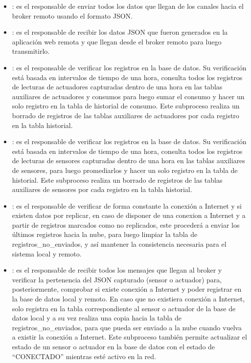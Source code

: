 \begin{itemize}
\item {}: es el responsable de enviar todos los datos que llegan de los canales hacia el broker remoto usando el formato JSON.

\item {}: es el responsable de recibir los datos JSON que fueron generados en la aplicación web remota y que llegan desde el broker remoto para luego transmitirlo.

\item {}: es el responsable de verificar los registros en la base de datos. Su verificación está basada en intervalos de tiempo de una hora, consulta todos los registros de lecturas de actuadores capturadas dentro de una hora en las tablas auxiliares de actuadores y consumos para luego sumar el consumo y hacer un solo registro en la tabla de historial de consumo. Este subproceso realiza un borrado de registros de las tablas auxiliares de actuadores por cada registro en la tabla historial.

\item {}: es el responsable de verificar los registros en la base de datos. Su verificación está basada en intervalos de tiempo de una hora, consulta todos los registros de lecturas de sensores capturadas dentro de una hora en las tablas auxiliares de sensores, para luego promediarlos y hacer un solo registro en la tabla de historial. Este subproceso realiza un borrado de registros de las tablas auxiliares de sensores por cada registro en la tabla historial.

\item {}: es el responsable de verificar de forma constante la conexión a Internet y si existen datos por replicar, en caso de disponer de una conexion a Internet y a partir de registros marcados como no replicados, este procederá a enviar los últimos registros hacia la nube, para luego limpiar la tabla de registros\_no\_enviados, y así mantener la consistencia necesaria para el sistema local y remoto.

\item {}: es el responsable de recibir todos los mensajes que llegan al broker y verificar la pertenencia del JSON capturado (sensor o actuador) para, posteriormente, comprobar si existe conexión a Internet y poder registrar en la base de datos local y remoto. En caso que no existiera conexión a Internet, solo registra en la tabla correspondiente al sensor o actuador de la base de datos local y a su vez realiza una copia hacia la tabla de registros\_no\_enviados, para que pueda ser enviado a la nube cuando vuelva a existir la conexión a Internet. Este subproceso también permite actualizar el estado de un sensor o actuador en la base de datos con el estado de ``CONECTADO'' mientras esté activo en la red.


\end{itemize}
